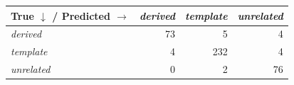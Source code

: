 \begin{tabular}{lrrr}
\toprule
True $\downarrow$ / Predicted $\rightarrow$ & \textit{derived} & \textit{template} & \textit{unrelated} \\
\midrule
\textit{derived} & 73 & 5 & 4 \\
\textit{template} & 4 & 232 & 4 \\
\textit{unrelated} & 0 & 2 & 76 \\
\bottomrule
\end{tabular}

